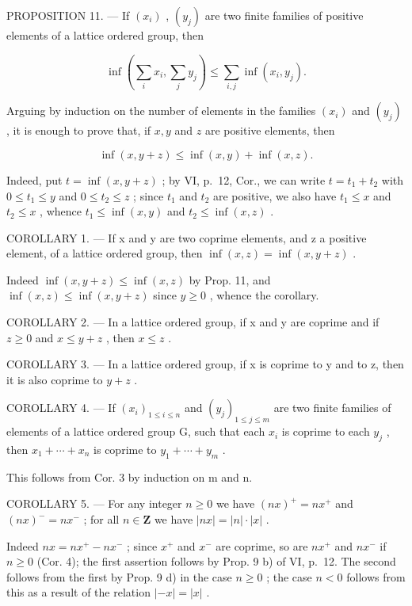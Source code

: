 PROPOSITION 11. --- If \((x_{i})\) , \((y_{j})\) are two finite families of positive elements of a lattice ordered group, then

\[
\inf \left(\sum_ {i} x _ {i}, \sum_ {j} y _ {j}\right) \leqslant \sum_ {i, j} \inf (x _ {i}, y _ {j}).
\]

Arguing by induction on the number of elements in the families \((x_{i})\) and \((y_{j})\) , it is enough to prove that, if \(x, y\) and \(z\) are positive elements, then

\[
\inf (x, y + z) \leqslant \inf (x, y) + \inf (x, z).
\]

Indeed, put \(t = \inf(x, y + z)\) ; by VI, p.~12, Cor., we can write \(t = t_1 + t_2\) with \(0 \leqslant t_1 \leqslant y\) and \(0 \leqslant t_2 \leqslant z\) ; since \(t_1\) and \(t_2\) are positive, we also have \(t_1 \leqslant x\) and \(t_2 \leqslant x\) , whence \(t_1 \leqslant \inf(x, y)\) and \(t_2 \leqslant \inf(x, z)\) .

COROLLARY 1. --- If x and y are two coprime elements, and z a positive element, of a lattice ordered group, then \(\inf(x, z) = \inf(x, y + z)\) .

Indeed \(\inf (x,y + z)\leqslant \inf (x,z)\) by Prop. 11, and \(\inf (x,z)\leqslant \inf (x,y + z)\) since \(y\geqslant 0\) , whence the corollary.

COROLLARY 2. --- In a lattice ordered group, if x and y are coprime and if \(z \geqslant 0\) and \(x \leqslant y + z\) , then \(x \leqslant z\) .

COROLLARY 3. --- In a lattice ordered group, if x is coprime to y and to z, then it is also coprime to \(y + z\) .

COROLLARY 4. --- If \((x_i)_{1 \leq i \leq n}\) and \((y_j)_{1 \leq j \leq m}\) are two finite families of elements of a lattice ordered group G, such that each \(x_i\) is coprime to each \(y_j\) , then \(x_1 + \cdots + x_n\) is coprime to \(y_1 + \cdots + y_m\) .

This follows from Cor. 3 by induction on m and n.

COROLLARY 5. --- For any integer \(n \geqslant 0\) we have \((nx)^+ = nx^+\) and \((nx)^- = nx^-\) ; for all \(n \in \mathbf{Z}\) we have \(|nx| = |n| \cdot |x|\) .

Indeed \(nx = nx^{+} - nx^{-}\) ; since \(x^{+}\) and \(x^{-}\) are coprime, so are \(nx^{+}\) and \(nx^{-}\) if \(n \geqslant 0\) (Cor. 4); the first assertion follows by Prop. 9 b) of VI, p.~12. The second follows from the first by Prop. 9 d) in the case \(n \geqslant 0\) ; the case \(n < 0\) follows from this as a result of the relation \(|-x| = |x|\) .

